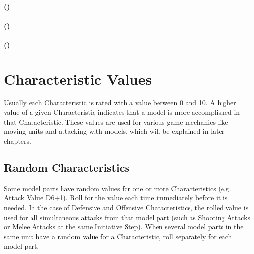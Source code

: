 
\paragraph{\OffensiveSkillInitials{} (\OffensiveSkill{})}


\paragraph{\StrengthInitials{} (\Strength{})}


\paragraph{\ArmourPenetrationInitials{} (\ArmourPenetration{})}


\section{Characteristic Values}
\label{characteristic_values}

Usually each Characteristic is rated with a value between 0 and 10. A higher value of a given Characteristic indicates that a model is more accomplished in that Characteristic. These values are used for various game mechanics like moving units and attacking with models, which will be explained in later chapters.

\subsection{Random Characteristics}

Some model parts have random values for one or more Characteristics (e.g. Attack Value D6+1). Roll for the value each time immediately before it is needed. In the case of Defensive and Offensive Characteristics, the rolled value is used for all simultaneous attacks from that model part (such as Shooting Attacks  or Melee Attacks at the same Initiative Step). When several model parts in the same unit have a random value for a Characteristic, roll separately for each model part.

